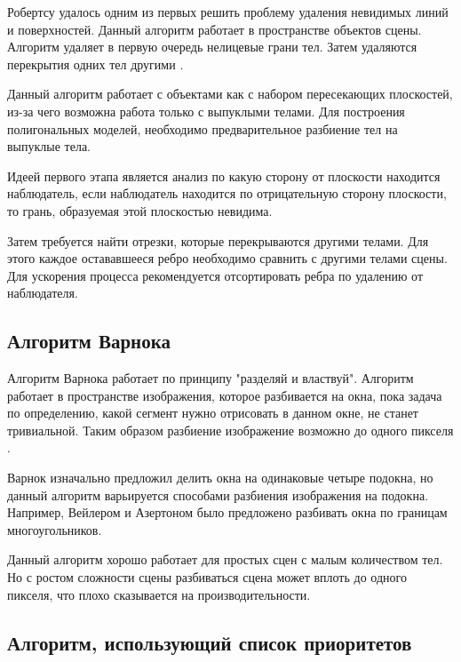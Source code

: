 Робертсу удалось одним из первых решить проблему удаления невидимых линий и поверхностей. Данный алгоритм работает в пространстве объектов сцены. Алгоритм удаляет в первую очередь нелицевые грани тел. Затем удаляются перекрытия одних тел другими  \cite[с. 250]{Rogers89}.

\par
Данный алгоритм работает с объектами как с набором пересекающих плоскостей, из-за чего возможна работа только с выпуклыми телами. Для построения полигональных моделей, необходимо предварительное разбиение тел на выпуклые тела.
\par
Идеей первого этапа является анализ по какую сторону от плоскости находится наблюдатель, если наблюдатель находится по отрицательную сторону плоскости, то грань, образуемая этой плоскостью невидима.
\par
Затем требуется найти отрезки, которые перекрываются другими телами. Для этого каждое остававшееся ребро необходимо сравнить с другими телами сцены. Для ускорения процесса рекомендуется отсортировать ребра по удалению от наблюдателя.

\subsection{Алгоритм Варнока}

Алгоритм Варнока работает по принципу "разделяй и властвуй".  Алгоритм работает в пространстве изображения, которое разбивается на окна, пока задача по определению, какой сегмент нужно отрисовать в данном окне, не станет тривиальной. Таким образом разбиение изображение возможно до одного пикселя  \cite[с. 290]{Rogers89}. 
\par
Варнок изначально предложил делить окна на одинаковые четыре подокна, но данный алгоритм варьируется способами разбиения изображения на подокна. Например, Вейлером и Азертоном было предложено разбивать окна по границам многоугольников.
\par
Данный алгоритм хорошо работает для простых сцен с малым количеством тел. Но с ростом сложности сцены разбиваться сцена может вплоть до одного пикселя, что плохо сказывается на производительности.

\subsection{Алгоритм, использующий список приоритетов}

